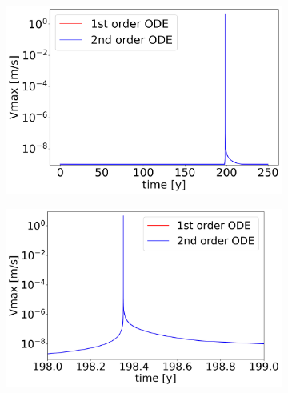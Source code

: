 \begin{figure}[H]
    \centering
    \begin{subfigure}{0.32\textwidth}
     	\centering
    	\includegraphics[width=1\textwidth]{images/TANDEMcompareFormulationstimeEvolutionVall.png}
    \end{subfigure} 
    \begin{subfigure}{0.32\textwidth}
    	\centering
    	\includegraphics[width=1\textwidth]{images/TANDEMcompareFormulationstimeEvolutionVsurroundings.png}
    \end{subfigure}
    \begin{subfigure}{0.32\textwidth}
    	\centering

\end{subfigure}
\end{figure}
